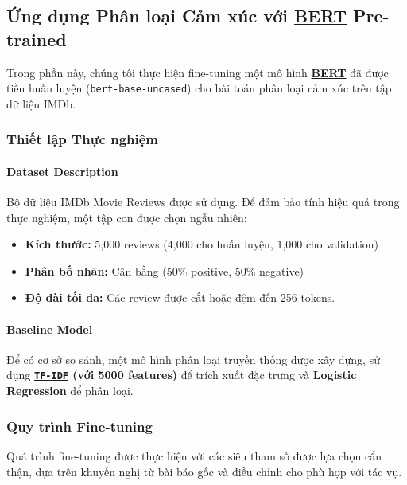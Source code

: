     \subsection{Ứng dụng Phân loại Cảm xúc với \hyperref[acro:bert]{\textbf{BERT}} Pre-trained}
    \label{ssec:phan_loai_cam_xuc}
    Trong phần này, chúng tôi thực hiện fine-tuning một mô hình \hyperref[acro:bert]{\textbf{BERT}} đã được tiền huấn luyện (\texttt{bert-base-uncased}) cho bài toán phân loại cảm xúc trên tập dữ liệu IMDb.
    
    \subsubsection{Thiết lập Thực nghiệm}
    
    \paragraph{Dataset Description}
    Bộ dữ liệu IMDb Movie Reviews \cite{maas2011learning} được sử dụng. Để đảm bảo tính hiệu quả trong thực nghiệm, một tập con được chọn ngẫu nhiên:
    \begin{itemize}
        \item \textbf{Kích thước:} 5,000 reviews (4,000 cho huấn luyện, 1,000 cho validation)
        \item \textbf{Phân bố nhãn:} Cân bằng (50\% positive, 50\% negative)  
        \item \textbf{Độ dài tối đa:} Các review được cắt hoặc đệm đến 256 tokens.
    \end{itemize}
    
    \paragraph{Baseline Model}
    Để có cơ sở so sánh, một mô hình phân loại truyền thống được xây dựng, sử dụng \textbf{\hyperref[acro:tfidf]{\texttt{TF-IDF}} (với 5000 features)} để trích xuất đặc trưng và \textbf{Logistic Regression} để phân loại.
    
    \subsubsection{Quy trình Fine-tuning}
    Quá trình fine-tuning được thực hiện với các siêu tham số được lựa chọn cẩn thận, dựa trên khuyến nghị từ bài báo gốc và điều chỉnh cho phù hợp với tác vụ.
    
